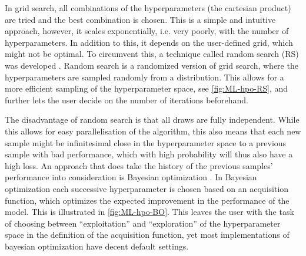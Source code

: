 In grid search, all combinations of the hyperparameters (the cartesian product) are tried and the best combination is chosen. This is a simple and intuitive approach, however, it scales exponentially, i.e. very poorly, with the number of hyperparameters. In addition to this, it depends on the user-defined grid, which might not be optimal. To circumvent this, a technique called random search (RS) was developed \autocite{bergstraRandomSearchHyperparameter2012a}. Random search is a randomized version of grid search, where the hyperparameters are sampled randomly from a distribution. This allows for a more efficient sampling of the hyperparameter space, see \autoref{fig:ML-hpo-RS}, and further lets the user decide on the number of iterations beforehand.


The disadvantage of random search is that all draws are fully independent. While this allows for easy parallelisation of the algorithm, this also means that each new sample might be infinitesimal close in the hyperparameter space to a previous sample with bad performance, which with high probability will thus also have a high loss. An approach that does take the history of the previous samples' performance into consideration is Bayesian optimization \autocite{brochuTutorialBayesianOptimization2010a}. In Bayesian optimization each successive hyperparameter is chosen based on an acquisition function, which optimizes the expected improvement in the performance of the model. This is illustrated in \autoref{fig:ML-hpo-BO}. This leaves the user with the task of choosing between ``exploitation'' and ``exploration'' of the hyperparameter space in the definition of the acquisition function, yet most implementations of bayesian optimization have decent default settings.

